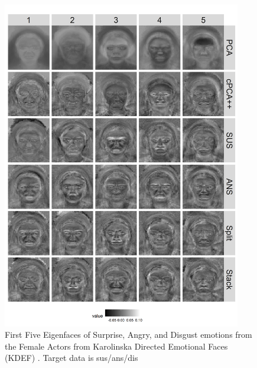 \documentclass[12pt]{article}
\begin{document}
\begin{figure}[!th]
    \centering
	\includegraphics[width = 0.93\textwidth]{figure/F_Surprise_Angry_Disgust.png}
	\caption{First Five Eigenfaces of Surprise, Angry, and Disgust emotions from the Female Actors from Karolinska Directed Emotional Faces (KDEF) \cite{Calvo2008}. Target data is sus/ans/dis }
	    \label{fig:Faces}
\end{figure}
\end{document}
